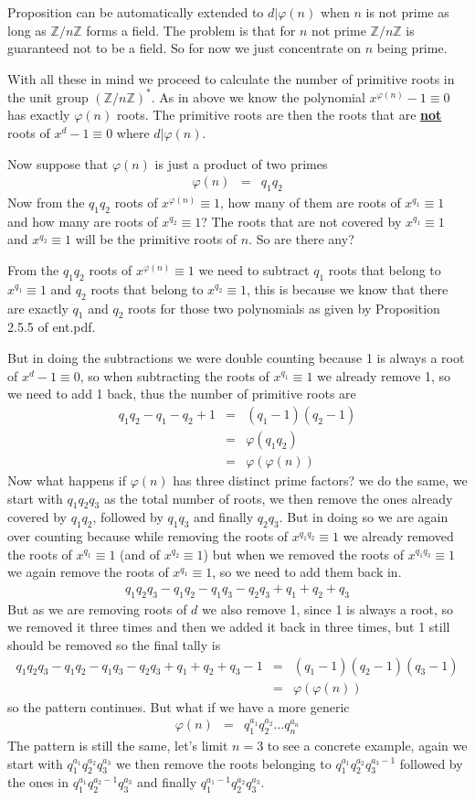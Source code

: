 \documentclass[aps,preprint,preprintnumbers,nofootinbib,showpacs,prd]{revtex4-1}
\newcommand{\nbea}{\begin{eqnarray*}}
\newcommand{\neea}{\end{eqnarray*}}
\begin{document}
Proposition can be automatically extended to $d|\varphi(n)$ when $n$ is not prime as long as $\mathbb{Z}/n\mathbb{Z}$ forms a field. The problem is that for $n$ not prime $\mathbb{Z}/n\mathbb{Z}$ is guaranteed not to be a field. So for now we just concentrate on $n$ being prime.

With all these in mind we proceed to calculate the number of primitive roots in the unit group $(\mathbb{Z}/n\mathbb{Z})^*$. As in above we know the polynomial $x^{\varphi(n)} - 1 \equiv 0$ has exactly $\varphi(n)$ roots. The primitive roots are then the roots that are \underline{{\bf not}} roots of $x^d - 1 \equiv 0$ where $d|\varphi(n)$.

Now suppose that $\varphi(n)$ is just a product of two primes
%
\nbea
\varphi(n) & = & q_1q_2
\neea
%
Now from the $q_1q_2$ roots of $x^{\varphi(n)} \equiv 1$, how many of them are roots of $x^{q_1} \equiv 1$ and how many are roots of $x^{q_2} \equiv 1$? The roots that are not covered by $x^{q_{1}} \equiv 1$ and $x^{q_{2}} \equiv 1$ will be the primitive roots of $n$. So are there any?

From the $q_1q_2$ roots of $x^{\varphi(n)} \equiv 1$ we need to subtract $q_1$ roots that belong to $x^{q_1} \equiv 1$ and $q_2$ roots that belong to $x^{q_2} \equiv 1$, this is because we know that there are exactly $q_1$ and $q_2$ roots for those two polynomials as given by Proposition 2.5.5 of ent.pdf.

But in doing the subtractions we were double counting because 1 is always a root of $x^d - 1 \equiv 0$, so when subtracting the roots of $x^{q_1} \equiv 1$ we already remove 1, so we need to add 1 back, thus the number of primitive roots are
%
\nbea
q_1q_2 - q_1 - q_2 + 1 & = & (q_1 - 1)(q_2 - 1) \\
& = & \varphi(q_1q_2) \\
& = & \varphi(\varphi(n))
\neea
%
Now what happens if $\varphi(n)$ has three distinct prime factors? we do the same, we start with $q_1q_2q_3$ as the total number of roots, we then remove the ones already covered by $q_1q_2$, followed by $q_1q_3$ and finally $q_2q_3$. But in doing so we are again over counting because while removing the roots of $x^{q_1q_2} \equiv 1$ we already removed the roots of $x^{q_1} \equiv 1$ (and of $x^{q_2} \equiv 1$) but when we removed the roots of $x^{q_1q_3} \equiv 1$ we again remove the roots of $x^{q_1} \equiv 1$, so we need to add them back in.
%
\nbea
q_1q_2q_3 - q_1q_2 - q_1q_3 - q_2q_3 + q_1 + q_2 + q_3
\neea
%
But as we are removing roots of $d$ we also remove 1, since 1 is always a root, so we removed it three times and then we added it back in three times, but 1 still should be removed so the final tally is
%
\nbea
q_1q_2q_3 - q_1q_2 - q_1q_3 - q_2q_3 + q_1 + q_2 + q_3 - 1 & = & (q_1 - 1)(q_2 - 1)(q_3 - 1) \\
& = & \varphi(\varphi(n))
\neea
%
so the pattern continues. But what if we have a more generic
%
\nbea
\varphi(n) & = & q_1^{a_1}q_2^{a_2} \dots q_n^{a_n}
\neea
%
The pattern is still the same, let's limit $n=3$ to see a concrete example, again we start with $q_1^{a_1}q_2^{a_2}q_3^{a_3}$ we then remove the roots belonging to $q_1^{a_1}q_2^{a_2}q_3^{a_3-1}$ followed by the ones in $q_1^{a_1}q_2^{a_2-1}q_3^{a_3}$ and finally $q_1^{a_1-1}q_2^{a_2}q_3^{a_3}$.
\end{document}
